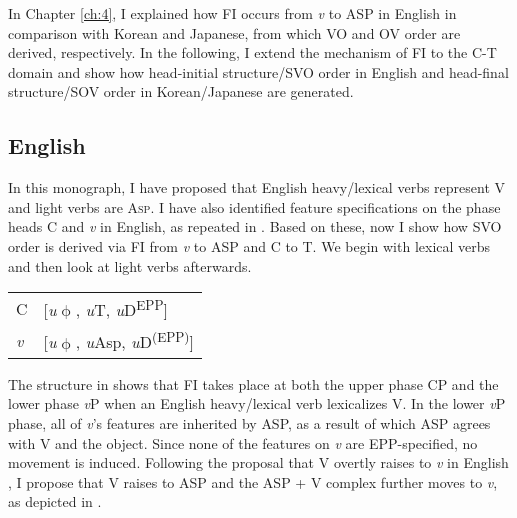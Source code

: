 In Chapter \ref{ch:4}, I explained how \ac{FI} occurs from \textit{v} to  \ac{ASP} in English in comparison with Korean and Japanese, from which \ac{VO} and \ac{OV} order are derived, respectively. In the following, I extend the mechanism of \ac{FI} to the C-T domain and show how head-initial structure/\ac{SVO} order in English and head-final structure/\ac{SOV} order in Korean/Japanese are generated.

\subsection{English}\label{ch6:sect:English}

In this monograph, I have proposed that English heavy/lexical verbs represent V and light verbs are A\textsc{sp.} I have also identified feature specifications on the phase heads C and \textit{v} in English, as repeated in . Based on these, now I show how \ac{SVO} order is derived via \ac{FI} from \textit{v} to \ac{ASP} and C to T. We begin with lexical verbs and then look at light verbs afterwards. 

\begin{exe}\ex\label{ex:152}
\begin{tabular}[t]{ll}
    C & [\textit{u}$\upphi$, \textit{u}T, \textit{u}D\textsuperscript{\ac{EPP}}] \\
    \textit{v} &   [\textit{u}$\upphi$, \textit{u}Asp, \textit{u}D\textsuperscript{(\ac{EPP})}]
\end{tabular}
\end{exe}

The structure in  shows that \ac{FI} takes place at both the upper phase \ac{CP} and the lower phase \textit{v}P when an English heavy/lexical verb lexicalizes V. In the lower \textit{v}P phase, all of \textit{v}’s features are inherited by \ac{ASP}, as a result of which \ac{ASP} agrees with V and the object. Since none of the features on \textit{v} are \ac{EPP}-specified, no movement is induced. Following the proposal that V overtly raises to \textit{v} in English \citep{Chomsky1995}, I propose that V raises to \ac{ASP} and the \ac{ASP} + V complex further moves to \textit{v}, as depicted in .

